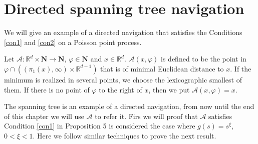  \section{Directed spanning tree navigation}
 We will give an example of a directed navigation that satisfies the Conditions \ref{con1} and \ref{con2} on a Poisson point process.
 \begin{defn} Let $\mathcal{A}:\mathbb{R}^{d}\times\textbf{N}\rightarrow \textbf{N}$, $\varphi\in\textbf{N}$ and $x\in\mathbb{R}^{d}$. $\mathcal{A}(x,\varphi)$ is defined to be the point in $\varphi\cap((\pi_1(x),\infty)\times\mathbb{R}^{d-1})$ that is of minimal Euclidean distance to $x$. If the minimum is realized in several points, we choose the lexicographic smallest of them. If there is no point of $\varphi$ to the right of $x$, then we put $\mathcal{A}(x,\varphi)=x$.
 \end{defn} 
 
The spanning tree is an example of a directed navigation, from now until the end of this chapter we will use $\mathcal{A}$ to refer it. Firs we will proof that $\mathcal{A}$ satisfies Condition \ref{con1} in \cite{WIAS} Proposition 5 is considered the case where $g(s)=s^\xi$, $0<\xi<1$. Here we follow similar techniques to prove the next result.


